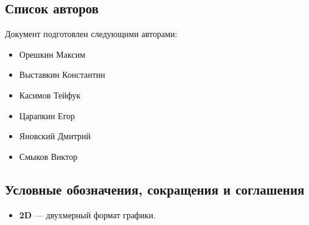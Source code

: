 \documentclass[a4paper,12pt]{article}
\begin{document}
\subsection{Список авторов}
Документ подготовлен следующими авторами:
\begin{itemize}
    \item Орешкин Максим
    \item Выставкин Константин
    \item Касимов Тейфук
    \item Царапкин Егор
    \item Яновский Дмитрий
    \item Смыков Виктор
\end{itemize}

\subsection{Условные обозначения, сокращения и соглашения}
\begin{itemize}
    \item \textbf{2D} — двухмерный формат графики.
\end{itemize}
\end{document}

